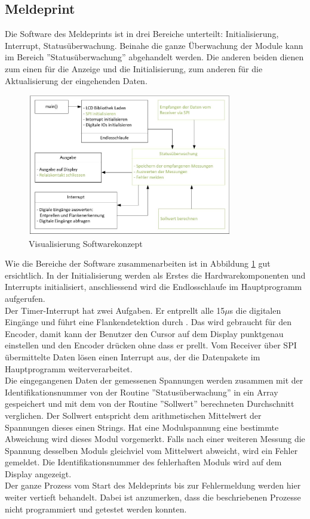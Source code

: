 \subsection{Meldeprint}
Die Software des Meldeprints ist in drei Bereiche unterteilt: Initialisierung, Interrupt, Statusüberwachung. Beinahe die ganze Überwachung der Module kann im Bereich ''Statusüberwachung'' abgehandelt werden. Die anderen beiden dienen zum einen für die Anzeige und die Initialisierung, zum anderen für die Aktualisierung der eingehenden Daten.

\begin{figure}[htbp] 
  \centering
     \includegraphics[width=0.8\textwidth]{graphics/reportboard-software-river}
  \caption{Visualisierung Softwarekonzept}
  \label{fig:reportboard-software-river}
\end{figure}

Wie die Bereiche der Software zusammenarbeiten ist in Abbildung \ref{fig:reportboard-software-river} gut ersichtlich. In der Initialisierung werden als Erstes die Hardwarekomponenten  und Interrupts initialisiert, anschliessend wird die Endlosschlaufe im Hauptprogramm aufgerufen.\\
Der Timer-Interrupt hat zwei Aufgaben. Er entprellt alle 15$\mu$s die digitalen Eingänge und führt eine Flankendetektion durch \cite{encodercode}. Das wird gebraucht für den Encoder, damit kann der Benutzer den Cursor auf dem Display punktgenau einstellen und den Encoder drücken ohne dass er prellt. Vom Receiver über SPI übermittelte Daten lösen einen Interrupt aus, der die Datenpakete im Hauptprogramm weiterverarbeitet.\\
Die eingegangenen Daten der gemessenen Spannungen werden zusammen mit der Identifikationsnummer von der Routine ''Statusüberwachung'' in ein Array gespeichert und mit dem von der Routine ''Sollwert'' berechneten Durchschnitt verglichen. Der Sollwert entspricht dem arithmetischen Mittelwert der Spannungen dieses einen Strings. Hat eine Modulspannung eine bestimmte Abweichung wird dieses Modul vorgemerkt. Falls nach einer weiteren Messung die Spannung desselben Moduls gleichviel vom Mittelwert abweicht, wird ein Fehler gemeldet. Die Identifikationsnummer des fehlerhaften Moduls wird auf dem Display angezeigt.\\
Der ganze Prozess vom Start des Meldeprints bis zur Fehlermeldung werden hier weiter vertieft behandelt. Dabei ist anzumerken, dass die beschriebenen Prozesse nicht programmiert und getestet werden konnten.

